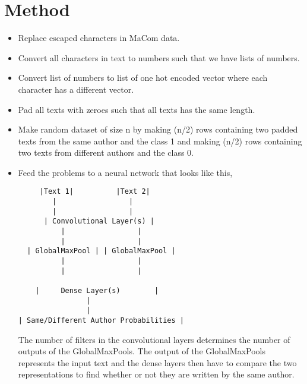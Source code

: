 \section{Method} \label{sec:method} 

\begin{itemize}
    \item Replace escaped characters in MaCom data.
    \item Convert all characters in text to numbers such that we have lists of
        numbers.
    \item Convert list of numbers to list of one hot encoded vector where each
        character has a different vector.
    \item Pad all texts with zeroes such that all texts has the same length.
    \item Make random dataset of size n by making (n/2) rows containing two
        padded texts from the same author and the class 1 and making (n/2) rows
        containing two texts from different authors and the class 0.
    \item Feed the problems to a neural network that looks like this,

        \begin{lstlisting}
     |Text 1|          |Text 2|
        |                 |
        |                 |
      | Convolutional Layer(s) |
          |                 |
          |                 |
  | GlobalMaxPool | | GlobalMaxPool |
          |                 |
          |                 |

    |     Dense Layer(s)        |
                |
                |
| Same/Different Author Probabilities |
        \end{lstlisting}

        The number of filters in the convolutional layers determines the number
        of outputs of the GlobalMaxPools. The output of the GlobalMaxPools
        represents the input text and the dense layers then have to compare the
        two representations to find whether or not they are written by the same
        author.

\end{itemize}
